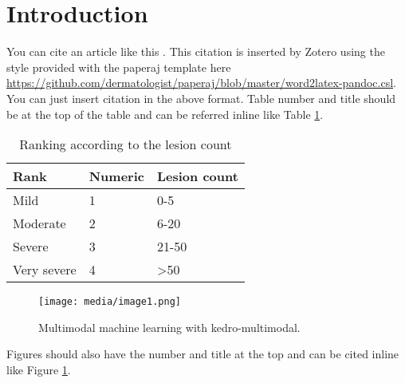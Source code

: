 


\section{\texorpdfstring{\textbf{Introduction}}{Introduction}} 


You can cite an article like this \cite{Eapen2020}. This citation is inserted by Zotero using the style provided with the paperaj template here \url{https://github.com/dermatologist/paperaj/blob/master/word2latex-pandoc.csl}. You can just insert citation in the above format. Table number and title should be at the top of the table and can be referred inline like  Table \ref{Table_1}. 


\begin{longtable}[]{@{}lll@{}} 
\caption{Ranking according to the lesion count} 
\label{Table_1} \\
\toprule 
Rank & Numeric & Lesion count\tabularnewline \midrule 
\endhead 
Mild & 1 & 0-5\tabularnewline Moderate & 2 & 6-20\tabularnewline Severe & 3 & 21-50\tabularnewline Very severe & 4 & \textgreater50\tabularnewline \bottomrule 
\end{longtable} 



\begin{figure} 
\centering 
\texttt{[image: media/image1.png]} 
\caption{Multimodal machine learning with kedro-multimodal.} 
\label{Figure_1} 
\end{figure} 


Figures should also have the number and title at the top and can be cited inline like  Figure \ref{Figure_1}. 




